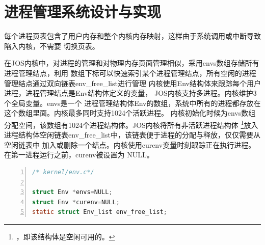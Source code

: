 \documentclass[12pt,openany,a4paper]{report}
\begin{document}
	\section{进程管理系统设计与实现}
	    每个进程页表包含了用户内存和整个内核内存映射，这样由于系统调用或中断导致陷入内核，不需要
	切换页表。\par
	    在JOS内核中，对进程的管理和对物理内存页面管理相似，采用envs数组存储所有进程管理结点，利用
	数组下标可以快速索引某个进程管理结点，所有空闲的进程管理结点通过双向链表env\_free\_list进行管理
	    内核使用Env结构体来跟踪每个用户进程，进程管理结点是Env结构体定义的变量，
	JOS内核支持多进程。内核维护3个全局变量。envs是一个
	进程管理结构体Env的数组，系统中所有的进程都存放在这个数组里面。内核最多同时支持1024个活跃进程。
	内核初始化时候为envs数组分配空间，该数组有1024个进程结构体。JOS内核将所有非活跃进程结构体
	\footnote{，即该结构体是空闲可用的。}放入
	进程结构体空闲链表env\_free\_list中，该链表便于进程的分配与释放，仅仅需要从空闲链表中
	加入或删除一个结点。内核使用curenv变量时刻跟踪正在执行进程。在第一进程运行之前，curenv被设置为
	NULL。\par
	
		\begin{lstlisting}[language=C,numbers=left,numberstyle=\tiny,keywordstyle=\color{blue},frame=shadowbox,rulesepcolor=\color{red!20!green!20!blue!20},commentstyle=\color{red!50!green!50!blue!50!}\selectfont,basicstyle=\ttfamily\fontsize{8}{8}\selectfont]
/* kernel/env.c*/

struct Env *envs=NULL;		
struct Env *curenv=NULL;
static struct Env_list env_free_list;
		\end{lstlisting}
\end{document}
